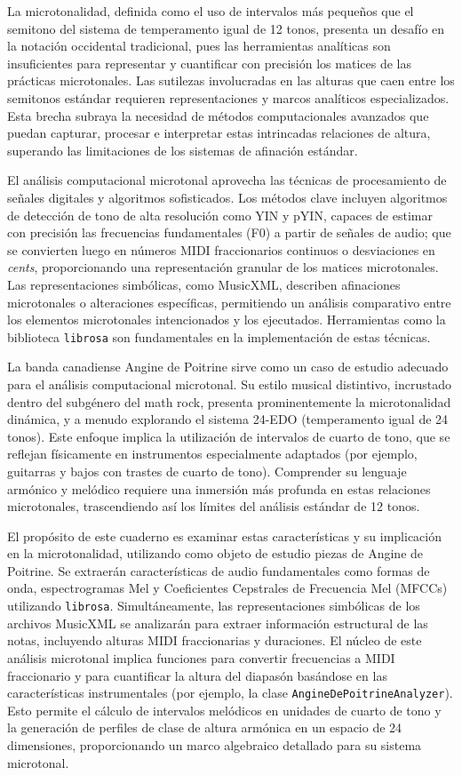 \documentclass[11pt, a4paper]{article}
\begin{document}
La microtonalidad, definida como el uso de intervalos más pequeños que el semitono del sistema de temperamento igual de 12 tonos, presenta un desafío en la notación occidental tradicional, pues las herramientas analíticas son insuficientes para representar y cuantificar con precisión los matices de las prácticas microtonales. Las sutilezas involucradas en las alturas que caen entre los semitonos estándar requieren representaciones y marcos analíticos especializados. Esta brecha subraya la necesidad de métodos computacionales avanzados que puedan capturar, procesar e interpretar estas intrincadas relaciones de altura, superando las limitaciones de los sistemas de afinación estándar.

El análisis computacional microtonal aprovecha las técnicas de procesamiento de señales digitales y algoritmos sofisticados. Los métodos clave incluyen algoritmos de detección de tono de alta resolución como YIN y pYIN, capaces de estimar con precisión las frecuencias fundamentales (F0) a partir de señales de audio; que se convierten luego en números MIDI fraccionarios continuos o desviaciones en \textit{cents}, proporcionando una representación granular de los matices microtonales. Las representaciones simbólicas, como MusicXML, describen afinaciones microtonales o alteraciones específicas, permitiendo un análisis comparativo entre los elementos microtonales intencionados y los ejecutados. Herramientas como la biblioteca \texttt{librosa} son fundamentales en la implementación de estas técnicas.

La banda canadiense Angine de Poitrine sirve como un caso de estudio adecuado para el análisis computacional microtonal. Su estilo musical distintivo, incrustado dentro del subgénero del math rock, presenta prominentemente la microtonalidad dinámica, y a menudo explorando el sistema 24-EDO (temperamento igual de 24 tonos). Este enfoque implica la utilización de intervalos de cuarto de tono, que se reflejan físicamente en instrumentos especialmente adaptados (por ejemplo, guitarras y bajos con trastes de cuarto de tono). Comprender su lenguaje armónico y melódico requiere una inmersión más profunda en estas relaciones microtonales, trascendiendo así los límites del análisis estándar de 12 tonos.

El propósito de este cuaderno es examinar estas características y su implicación en la microtonalidad, utilizando como objeto de estudio piezas de Angine de Poitrine. Se extraerán características de audio fundamentales como formas de onda, espectrogramas Mel y Coeficientes Cepstrales de Frecuencia Mel (MFCCs) utilizando \texttt{librosa}. Simultáneamente, las representaciones simbólicas de los archivos MusicXML se analizarán para extraer información estructural de las notas, incluyendo alturas MIDI fraccionarias y duraciones. El núcleo de este análisis microtonal implica funciones para convertir frecuencias a MIDI fraccionario y para cuantificar la altura del diapasón basándose en las características instrumentales (por ejemplo, la clase \texttt{AngineDePoitrineAnalyzer}). Esto permite el cálculo de intervalos melódicos en unidades de cuarto de tono y la generación de perfiles de clase de altura armónica en un espacio de 24 dimensiones, proporcionando un marco algebraico detallado para su sistema microtonal.
\end{document}

